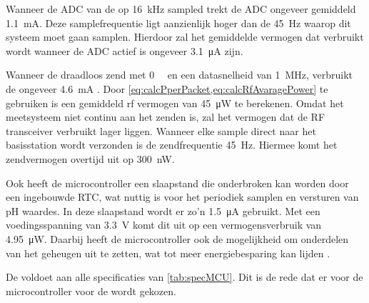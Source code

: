 Wanneer de ADC van de \mcu op \qty{16}{\kilo\hertz} sampled trekt de ADC ongeveer gemiddeld \qty{1.1}{\milli\ampere}. Deze samplefrequentie ligt aanzienlijk hoger dan de \qty{45}{\hertz} waarop dit systeem moet gaan samplen. Hierdoor zal het gemiddelde vermogen dat verbruikt wordt wanneer de ADC actief is ongeveer \qty{3.1}{\micro\ampere} zijn.

Wanneer de \mcu draadloos zend met \qty{0}{\deci\belmilliwatt} en een datasnelheid van \qty{1}{\mega\hertz}, verbruikt de \mcu ongeveer \qty{4.6}{\milli\ampere} \cite{nrf52810}. Door \cref{eq:calcPperPacket,eq:calcRfAvaragePower} te gebruiken is een gemiddeld rf vermogen van \qty{45}{\micro\watt} te berekenen. Omdat het \si{\pH} meetsysteem niet continu aan het zenden is, zal het vermogen dat de RF transceiver verbruikt lager liggen. Wanneer elke sample direct naar het basisstation wordt verzonden is de zendfrequentie \qty{45}{\hertz}. Hiermee komt het zendvermogen overtijd uit op \qty{300}{\nano\watt}.

Ook heeft de microcontroller een slaapstand die onderbroken kan worden door een ingebouwde RTC, wat nuttig is voor het periodiek samplen en versturen van pH waardes. In deze slaapstand wordt er zo'n \qty{1.5}{\micro\ampere} gebruikt. Met een voedingsspanning van \qty{3.3}{\volt} komt dit uit op een vermogensverbruik van \qty{4.95}{\micro\watt}. Daarbij heeft de microcontroller ook de mogelijkheid om onderdelen van het geheugen uit te zetten, wat tot meer energiebesparing kan lijden \cite{nrf52810}.

De \mcu voldoet aan alle specificaties van \cref{tab:specMCU}. Dit is de rede dat er voor de microcontroller voor de \mcu wordt gekozen.
